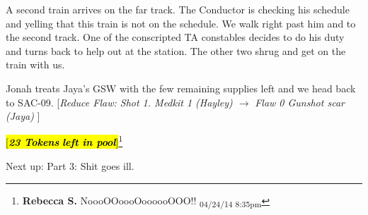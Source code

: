 A second train arrives on the far track.  The Conductor is checking his schedule and yelling that this train is not on the schedule. We walk right past him and to the second track.  One of the conscripted TA constables decides to do his duty and turns back to help out at the station.  The other two shrug and get on the train with us.



Jonah treats Jaya's GSW with the few remaining supplies left and we head back to SAC-09.  {[}\textit{Reduce Flaw: Shot 1.  Medkit 1 (Hayley) $\rightarrow$  }\textit{ {\color[RGB]{255,0,0}Flaw 0 Gunshot scar (Jaya)} }{]}



\hl{{[}\textit{\textbf{23 Tokens}}\textit{\textbf{ left in pool}}{]}}\footnote{\textbf{Rebecca S. }NoooOOoooOoooooOOO!! \textsubscript{04/24/14 8:35pm}}



Next up: Part 3: Shit goes ill.









